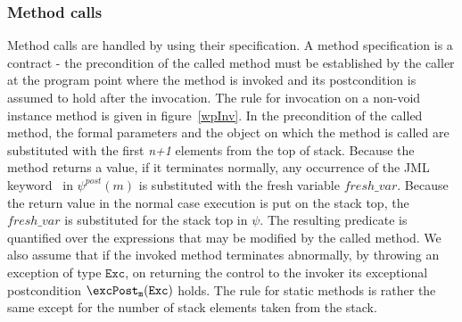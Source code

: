 \subsubsection{Method calls}
Method calls are handled by using their specification. A method specification is a contract - the precondition of the called method
must be established by the caller at the program point where the method is invoked and its postcondition is assumed to hold after the invocation. The rule for
invocation on a non-void instance method is given in figure~\ref{wpInv}. In the precondition of the called method, the formal parameters and the object on which the method is called are substituted with the first \textit{n+1} elements from the top of stack. 
Because the method returns a value, if it terminates normally, any occurrence of the JML keyword \result \ in $\psi^{post}(m)$ is substituted with the fresh variable $fresh\_var$.  
Because the return value in the normal case execution is put on the stack top, the $fresh\_var$ is substituted for the stack top in $\psi$. The resulting predicate is quantified over the expressions that may be modified by the called method. We also assume that if the invoked method terminates abnormally, by throwing an exception of type $\texttt{Exc}$, on returning the control to the invoker its exceptional postcondition $\excPost_{\tt{m} }( \tt{Exc} )$ holds. 
The rule for static methods is rather the same except for the number of stack elements taken from the stack.  

